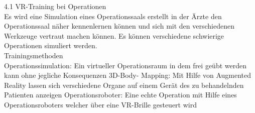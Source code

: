 4.1 VR-Training bei Operationen \\
Es wird eine Simulation eines Operationssaals erstellt in der Ärzte den Operationssaal näher kennenlernen können und sich mit den verschiedenen Werkzeuge vertraut machen können. Es können verschiedene schwierige Operationen simuliert werden.\\
Trainingsmethoden\\
Operationssimulation:
Ein virtueller Operationsraum in dem frei geübt werden kann ohne jegliche Konsequenzen
3D-Body- Mapping:
Mit Hilfe von Augmented Reality lassen sich verschiedene Organe auf einem Gerät des zu behandelnden Patienten anzeigen
Operationsroboter:
Eine echte Operation mit Hilfe eines Operationsroboters welcher über eine VR-Brille gesteuert wird

